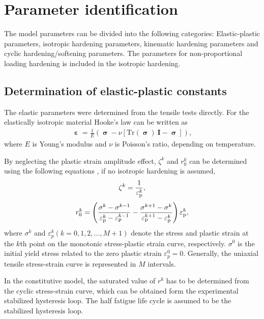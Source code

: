 \documentclass[preprint,5p,twocolumn,11pt,sort&compress]{elsarticle}
\newcommand{\bfsigma}{{\bm{\upsigma}}}
\newcommand{\bfepsilon}{{\bm{\upepsilon}}}
\begin{document}
\section{Parameter identification}
\noindent
The model parameters can be divided into the following categories: Elastic-plastic parameters, isotropic hardening parameters, kinematic hardening parameters and cyclic hardening/softening parameters. The parameters for non-proportional loading hardening is included in the isotropic hardening.

\subsection{Determination of elastic-plastic constants}

\noindent
The elastic parameters were determined from the tensile tests directly. For the elastically isotropic material Hooke's law can be written as
\begin{eqnarray}
   \bfepsilon = \frac{1}{E}(\bfsigma - \nu[\mathrm{Tr}(\bfsigma)~\mathbf{I} - \bfsigma]),
\label{Equ:HookesLawInEandNu}
\end{eqnarray}
where $E$ is  Young's modulus and $\nu$ is Poisson's ratio, depending on temperature.

By neglecting the plastic strain amplitude effect, ${\zeta ^k}$ and  $r_0^k$ can be determined using the following equations \cite{Jiang1996387, jiang1996modeling}, if no isotropic hardening is assumed,
\begin{equation}
{\zeta ^k} = \frac{1}{{\varepsilon _{\rm p}^k}},
\label{Eqn:zetak}
\end{equation}
\begin{equation}
r_0^k = \left( {\frac{{\sigma _{}^k - \sigma _{}^{k - 1}}}{{\varepsilon _{\rm p}^k - \varepsilon _{\rm p}^{k - 1}}} - \frac{{\sigma _{}^{k + 1} - \sigma _{}^k}}{{\varepsilon _{\rm p}^{k + 1} - \varepsilon _{\rm p}^k}}} \right)\varepsilon _{\rm p}^k,
\end{equation}
where $\sigma^k$ and $\varepsilon_p^k( k = 0,1,2,...,M+1 )$ denote the stress and plastic strain at the $k$th point on the monotonic  stress-plastic strain curve, respectively. $\sigma^0$ is the initial yield stress related to the zero plastic strain $\varepsilon_p^0=0$. Generally, the uniaxial tensile stress-strain curve is represented in $M$ intervals.

In the constitutive model, the saturated value of $r^k$ has to be determined from the cyclic stress-strain curve, which can be obtained form the experimental stabilized hysteresis loop.
The half fatigue life cycle is assumed to be the stabilized hysteresis loop.
\end{document}
